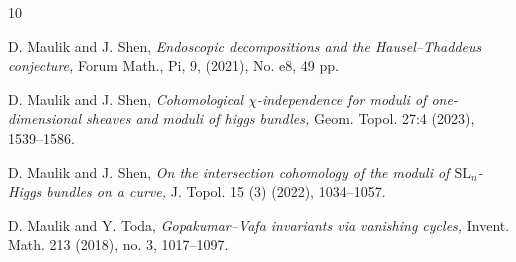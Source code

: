 \documentclass[11pt]{amsart}
\theoremstyle{plain}
\theoremstyle{definition}
\theoremstyle{remark}
\begin{document}
\begin{thebibliography}{10}












 D. Maulik and J. Shen, {\em Endoscopic decompositions and the Hausel--Thaddeus
conjecture,} Forum Math., Pi, 9, (2021), No. e8, 49 pp.

 D. Maulik and J. Shen, {\em Cohomological $\chi$-independence for moduli of one-dimensional sheaves and moduli of
higgs bundles,} Geom. Topol. 27:4 (2023), 1539--1586. 

 D. Maulik and J. Shen, {\em On the intersection cohomology of the moduli of $\mathrm{SL}_n$-Higgs bundles on a curve,}  J. Topol. 15 (3) (2022), 1034--1057.

 D. Maulik and Y. Toda, {\em Gopakumar--Vafa invariants via vanishing cycles,} Invent. Math. 213 (2018), no. 3, 1017--1097. 



\end{thebibliography}
\end{document}
